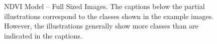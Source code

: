 \begin{figure}[h!]
    \caption[NDVI Model – Full Sized Images]{NDVI Model – Full Sized Images. The captions below the partial illustrations correspond to the classes shown in the example images. However, the illustrations generally show more classes than are indicated in the captions.}
    \label{fig:ndvi_ablation_examples_fs}
\end{figure}


